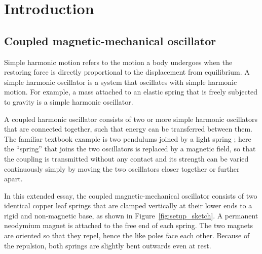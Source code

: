 \section{Introduction}

\subsection{Coupled magnetic-mechanical oscillator}

Simple harmonic motion refers to the motion a body undergoes when the restoring force is directly proportional to the displacement from equilibrium. A simple harmonic oscillator is a system that oscillates with simple harmonic motion. For example, a mass attached to an elastic spring that is freely subjected to gravity is a simple harmonic oscillator.

A coupled harmonic oscillator consists of two or more simple harmonic oscillators that are connected together, such that energy can be transferred between them. The familiar textbook example is two pendulums joined by a light spring \cite{young}; here the ``spring'' that joins the two oscillators is replaced by a magnetic field, so that the coupling is transmitted without any contact and its strength can be varied continuously simply by moving the two oscillators closer together or further apart.

In this extended essay, the coupled magnetic-mechanical oscillator consists of two identical copper leaf springs that are clamped vertically at their lower ends to a rigid and non-magnetic base, as shown in Figure~\ref{fig:setup_sketch}. A permanent neodymium magnet is attached to the free end of each spring. The two magnets are oriented so that they repel, hence the like poles face each other. Because of the repulsion, both springs are slightly bent outwards even at rest.

